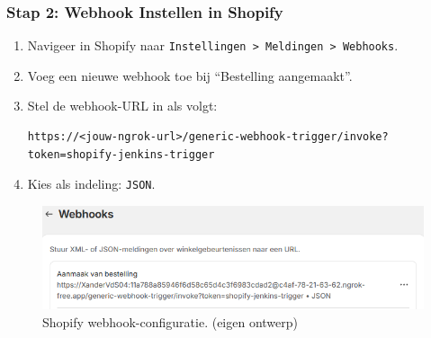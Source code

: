 \subsubsection{Stap 2: Webhook Instellen in Shopify}
\begin{enumerate}
    \item Navigeer in Shopify naar \texttt{Instellingen > Meldingen > Webhooks}.
    \item Voeg een nieuwe webhook toe bij ``Bestelling aangemaakt''.
    \item Stel de webhook-URL in als volgt:
    \begin{lstlisting}[language=text]
        https://<jouw-ngrok-url>/generic-webhook-trigger/invoke?token=shopify-jenkins-trigger
    \end{lstlisting}
    \item Kies als indeling: \texttt{JSON}.
\end{enumerate}

\vspace{0.5em}
\begin{figure}[H]
    \centering
    \includegraphics[width=1\linewidth]{foto's/ShopifyWebhookConfig.png}
    \caption{Shopify webhook-configuratie. (eigen ontwerp)}
    \label{fig:Shopify-Webhook-configuratie}
\end{figure}

